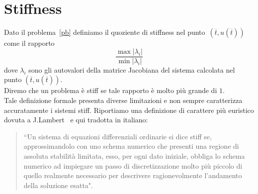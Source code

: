 \section{Stiffness}
Dato il problema~\eqref{pb} definiamo il quoziente di stiffness nel punto~$\left(\overline{t},u\left(\overline{t}\right)\right)$  come il rapporto 
 $$ \frac{ \max \vert\lambda_i \vert }{\min \vert \lambda_i \vert}$$ 
 dove $\lambda_i$ sono gli autovalori della matrice Jacobiana del sistema calcolata nel punto  $\left(\overline{t},u\left(\overline{t}\right)\right)$.\\
 Diremo che un problema \`e stiff se tale rapporto \`e molto pi\`u grande di $1$.\\
Tale definizione formale presenta diverse limitazioni e non sempre caratterizza accuratamente i sistemi stiff.  Riportiamo una definizione di carattere pi\`u euristico dovuta a J.Lambert~\cite{lambert1991numerical} e qui tradotta in italiano:
\begin{quote}
``Un sistema di equazioni differenziali ordinarie si dice stiff se, 
approssimandolo con uno schema numerico che presenti una regione di assoluta stabilit\`a limitata, esso, per ogni dato iniziale, obbliga lo schema numerico ad impiegare un passo di discretizzazione molto pi\`u piccolo di quello realmente necessario per descrivere ragionevolmente l'andamento della soluzione esatta".
\end{quote}
